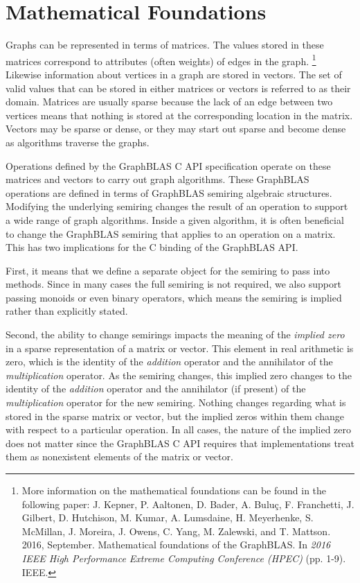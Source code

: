 \restoregeometry


\section{Mathematical Foundations}

Graphs can be represented in terms of matrices. The values stored in these 
matrices correspond to attributes (often weights) of edges in the graph.
\footnote{More information on the mathematical foundations can be found in the following paper: J. Kepner, P. Aaltonen, D. Bader,  A. Buluç, F. Franchetti, J. Gilbert, D. Hutchison, M. Kumar, A. Lumsdaine, H. Meyerhenke, S. McMillan, J. Moreira, J. Owens, C. Yang, M. Zalewski, and T. Mattson. 2016, September. Mathematical foundations of the GraphBLAS. In \emph{2016 IEEE High Performance Extreme Computing Conference (HPEC)} (pp. 1-9). IEEE.} 
Likewise information about vertices in a graph are stored in vectors.
The set of valid values that can be stored in either matrices or vectors
is referred to as their domain. Matrices are usually sparse because the 
lack of an edge between two vertices means that nothing is stored at the 
corresponding location in the matrix.  Vectors may be sparse or dense, or they may 
start out sparse and become dense as algorithms traverse the graphs.

Operations defined by the GraphBLAS C API specification operate on these 
matrices and vectors to carry out graph algorithms.  These GraphBLAS 
operations are defined in terms of GraphBLAS semiring algebraic 
structures. Modifying the underlying semiring changes the result of 
an operation to support a wide range of graph algorithms.
Inside a given algorithm, it is often beneficial to change the GraphBLAS 
semiring that applies to an operation on a matrix.  This has two 
implications for the C binding of the GraphBLAS API.  

First, it means that we define a separate object for the semiring 
to pass into methods.  Since in many cases the full
semiring is not required, we also support passing monoids or
even binary operators, which means the semiring is implied rather than 
explicitly stated.

Second, the ability to change semirings impacts the meaning of 
the \emph{implied zero} in a sparse representation of a matrix or vector.
This element in real arithmetic is zero, which is the 
identity of the \emph{addition} operator and the annihilator of the
\emph{multiplication} operator.  As the semiring changes, this 
implied zero changes to the identity of the \emph{addition} operator 
and the annihilator (if present) of the \emph{multiplication} operator 
for the new semiring. Nothing changes regarding what is stored in the sparse 
matrix or vector, but the implied zeros within them change with respect to a 
particular operation. In all cases, the nature of the implied zero does not 
matter since the GraphBLAS C API requires that implementations treat them as 
nonexistent elements of the matrix or vector.

